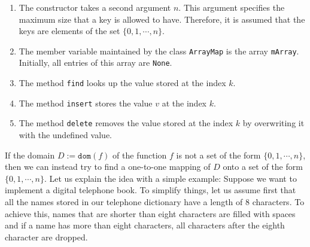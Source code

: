 \begin{enumerate}
\item The constructor takes a second argument $n$.  This argument specifies the
      maximum size that a key is allowed to have.  Therefore, it is assumed that
      the keys are elements of the set $\{0,1, \cdots, n\}$.
\item The member variable maintained by the class \texttt{ArrayMap} is the array \texttt{mArray}.
      Initially, all entries of this array are \texttt{None}.
\item The method \texttt{find} looks up the value stored at the index $k$.
\item The method \texttt{insert} stores the value $v$ at the index $k$.
\item The method \texttt{delete} removes the value stored at the index $k$ by overwriting it with the undefined
      value. 
\end{enumerate}
If the domain $D := \texttt{dom}(f)$ of the function $f$ is not a set of the form $\{0,1, \cdots, n\}$, 
then we can instead try to find a one-to-one mapping of $D$ onto a set of the form $\{0,1,\cdots,n\}$.
Let us explain the idea with a simple example:  Suppose we want to implement a digital
telephone book.
To simplify things, let us assume first that all the names stored in our telephone dictionary
have a length of 8 characters.  To achieve this, names that are shorter than eight characters
are filled with spaces and if a name has more than eight characters, all characters after the
eighth character are dropped.

